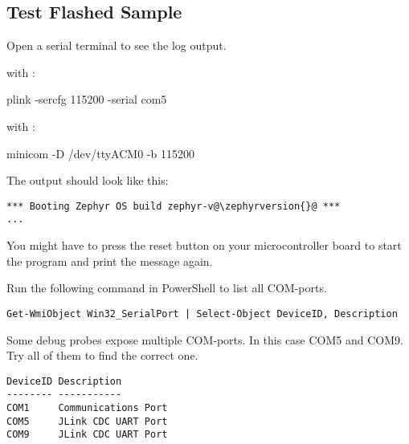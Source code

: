 \subsection{Test Flashed Sample}

Open a serial terminal to see the log output.

with :

\begin{monobox}
plink -sercfg 115200 -serial com5
\end{monobox}

with :

\begin{monobox}
minicom -D /dev/ttyACM0 -b 115200
\end{monobox}

The output should look like this:

\begin{lstlisting}
*** Booting Zephyr OS build zephyr-v@\zephyrversion{}@ ***
...
\end{lstlisting}

You might have to press the reset button on your microcontroller board to start the program and print the message again.

\begin{infobox}
  Run the following command in PowerShell to list all COM-ports.
\begin{lstlisting}
Get-WmiObject Win32_SerialPort | Select-Object DeviceID, Description
\end{lstlisting}

  Some debug probes expose multiple COM-ports.
  In this case COM5 and COM9.
  Try all of them to find the correct one.

\begin{lstlisting}
DeviceID Description
-------- -----------
COM1     Communications Port
COM5     JLink CDC UART Port
COM9     JLink CDC UART Port
\end{lstlisting}
\end{infobox}
